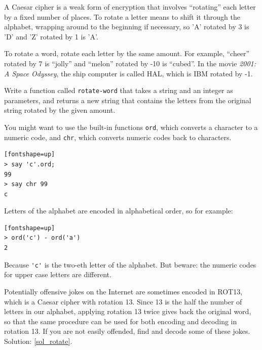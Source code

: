 

\begin{exercise}

\label{rotate}
A Caesar cipher is a weak form of encryption that involves ``rotating'' each
letter by a fixed number of places.  To rotate a letter means
to shift it through the alphabet, wrapping around to the beginning if
necessary, so 'A' rotated by 3 is 'D' and 'Z' rotated by 1 is 'A'.

To rotate a word, rotate each letter by the same amount.
For example, ``cheer'' rotated by 7 is ``jolly'' and ``melon'' rotated
by -10 is ``cubed''.  In the movie {\em 2001: A Space Odyssey}, the 
ship computer is called HAL, which is IBM rotated by -1.

Write a function called \verb"rotate-word"
that takes a string and an integer as parameters, and returns
a new string that contains the letters from the original string
rotated by the given amount.  

You might want to use the built-in functions {\tt ord}, which 
converts a character to a numeric code, and {\tt chr}, which 
converts numeric codes back to characters.  
\begin{verbatim}[fontshape=up]
> say 'c'.ord;
99
> say chr 99
c
\end{verbatim}
%

Letters of the alphabet are encoded in alphabetical
order, so for example:

\begin{verbatim}[fontshape=up]
> ord('c') - ord('a')
2
\end{verbatim}

Because \verb"'c'" is the two-eth letter of the alphabet.  But
beware: the numeric codes for upper case letters are different.

Potentially offensive jokes on the Internet are sometimes 
encoded in ROT13, which is a Caesar cipher with rotation 13. 
Since 13 is the half the number of letters in our alphabet, 
applying rotation 13 twice gives back the original word, 
so that the same procedure can be used for both encoding 
and decoding in rotation 13. If you are not
easily offended, find and decode some of these jokes.  Solution: \ref{sol_rotate}.

\end{exercise}

